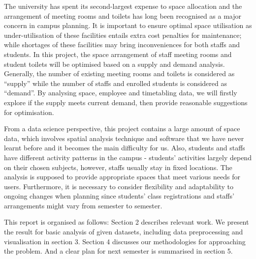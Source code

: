 The university has spent its second-largest expense to space allocation and the arrangement of meeting rooms and toilets has long been recognised as a major concern in campus planning. It is important to ensure optimal space utilisation as under-utilisation of these facilities entails extra cost penalties for maintenance; while shortages of these facilities may bring inconveniences for both staffs and students. In this project, the space arrangement of staff meeting rooms and student toilets will be optimised based on a supply and demand analysis. Generally, the number of existing meeting rooms and toilets is considered as “supply” while the number of staffs and enrolled students is considered as “demand”. By analysing space, employee and timetabling data, we will firstly explore if the supply meets current demand, then provide reasonable suggestions for optimisation. 

From a data science perspective, this project contains a large amount of space data, which involves spatial analysis technique and software that we have never learnt before and it becomes the main difficulty for us. Also, students and staffs have different activity patterns in the campus - students’ activities largely depend on their chosen subjects, however, staffs usually stay in fixed locations. The analysis is supposed to provide appropriate spaces that meet various needs for users. Furthermore, it is necessary to consider flexibility and adaptability to ongoing changes when planning since students’ class registrations and staffs’ arrangements might vary from semester to semester.

This report is organised as follows: Section 2 describes relevant work. We present the result for basic analysis of given datasets, including data preprocessing and visualisation in section 3. Section 4 discusses our methodologies for approaching the problem. And a clear plan for next semester is summarised in section 5.